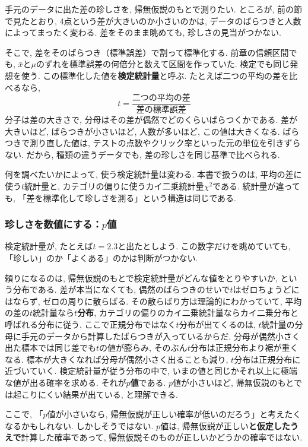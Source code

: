     手元のデータに出た差の珍しさを, 帰無仮説のもとで測りたい.
    ところが, 前の節で見たとおり, 4点という差が大きいのか小さいのかは, データのばらつきと人数によってまったく変わる.
    差をそのまま眺めても, 珍しさの見当がつかない.

    そこで, 差をそのばらつき（標準誤差）で割って標準化する.
    前章の信頼区間でも, $\bar{x}$と$\mu$のずれを標準誤差の何倍分と数えて区間を作っていた.
    検定でも同じ発想を使う.
    この標準化した値を\textbf{検定統計量}と呼ぶ.
    たとえば二つの平均の差を比べるなら,
    \[
      t = \frac{\text{二つの平均の差}}{\text{差の標準誤差}}
    \]
    分子は差の大きさで, 分母はその差が偶然でどのくらいばらつくかである.
    差が大きいほど, ばらつきが小さいほど, 人数が多いほど, この値は大きくなる.
    ばらつきで測り直した値は, テストの点数やクリック率といった元の単位を引きずらない.
    だから, 種類の違うデータでも, 差の珍しさを同じ基準で比べられる.

    何を調べたいかによって, 使う検定統計量は変わる.
    本書で扱うのは, 平均の差に使う$t$統計量と, カテゴリの偏りに使うカイ二乗統計量$\chi^2$である.
    統計量が違っても, 「差を標準化して珍しさを測る」という構造は同じである.

    \subsubsection*{珍しさを数値にする：\texorpdfstring{$p$}{p}値}

    検定統計量が, たとえば$t = 2.3$と出たとしよう.
    この数字だけを眺めていても, 「珍しい」のか「よくある」のかは判断がつかない.

    頼りになるのは, 帰無仮説のもとで検定統計量がどんな値をとりやすいか, という分布である.
    差が本当になくても, 偶然のばらつきのせいで$t$はゼロちょうどにはならず, ゼロの周りに散らばる.
    その散らばり方は理論的にわかっていて, 平均の差の$t$統計量なら\textbf{$t$分布}, カテゴリの偏りのカイ二乗統計量ならカイ二乗分布と呼ばれる分布に従う.
    ここで正規分布ではなく$t$分布が出てくるのは, $t$統計量の分母に手元のデータから計算したばらつきが入っているからだ.
    分母が偶然小さく出た標本では同じ差でも$t$の値が膨らみ, そのぶん$t$分布は正規分布より裾が重くなる.
    標本が大きくなれば分母が偶然小さく出ることも減り, $t$分布は正規分布に近づいていく.
    検定統計量が従う分布の中で, いまの値と同じかそれ以上に極端な値が出る確率を求める.
    それが\textbf{$p$値}である.
    $p$値が小さいほど, 帰無仮説のもとでは起こりにくい結果が出ている, と理解できる.

    ここで, 「$p$値が小さいなら, 帰無仮説が正しい確率が低いのだろう」と考えたくなるかもしれない.
    しかしそうではない.
    $p$値は, 帰無仮説が正しい\textbf{と仮定したうえで}計算した確率であって, 帰無仮説そのものが正しいかどうかの確率ではない.

